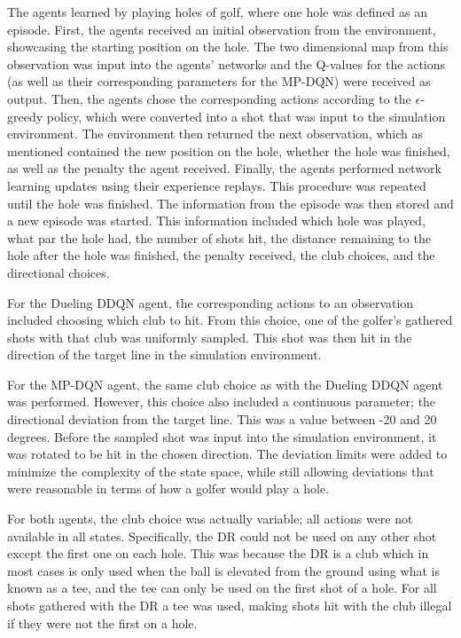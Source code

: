 \documentclass{kththesis}
\begin{document}
The agents learned by playing holes of golf, where one hole was defined as an episode. First, the agents received an initial observation from the environment, showcasing the starting position on the hole. The two dimensional map from this observation was input into the agents' networks and the Q-values for the actions (as well as their corresponding parameters for the MP-DQN) were received as output. Then, the agents chose the corresponding actions according to the $\epsilon$-greedy policy, which were converted into a shot that was input to the simulation environment. The environment then returned the next observation, which as mentioned contained the new position on the hole, whether the hole was finished, as well as the penalty the agent received. Finally, the agents performed network learning updates using their experience replays. This procedure was repeated until the hole was finished. The information from the episode was then stored and a new episode was started. This information included which hole was played, what par the hole had, the number of shots hit, the distance remaining to the hole after the hole was finished, the penalty received, the club choices, and the directional choices.

For the Dueling DDQN agent, the corresponding actions to an observation included choosing which club to hit. From this choice, one of the golfer's gathered shots with that club was uniformly sampled. This shot was then hit in the direction of the target line in the simulation environment.

For the MP-DQN agent, the same club choice as with the Dueling DDQN agent was performed. However, this choice also included a continuous parameter; the directional deviation from the target line. This was a value between -20 and 20 degrees. Before the sampled shot was input into the simulation environment, it was rotated to be hit in the chosen direction. The deviation limits were added to minimize the complexity of the state space, while still allowing deviations that were reasonable in terms of how a golfer would play a hole.

For both agents, the club choice was actually variable; all actions were not available in all states. Specifically, the DR could not be used on any other shot except the first one on each hole. This was because the DR is a club which in most cases is only used when the ball is elevated from the ground using what is known as a tee, and the tee can only be used on the first shot of a hole. For all shots gathered with the DR a tee was used, making shots hit with the club illegal if they were not the first on a hole.
\end{document}

